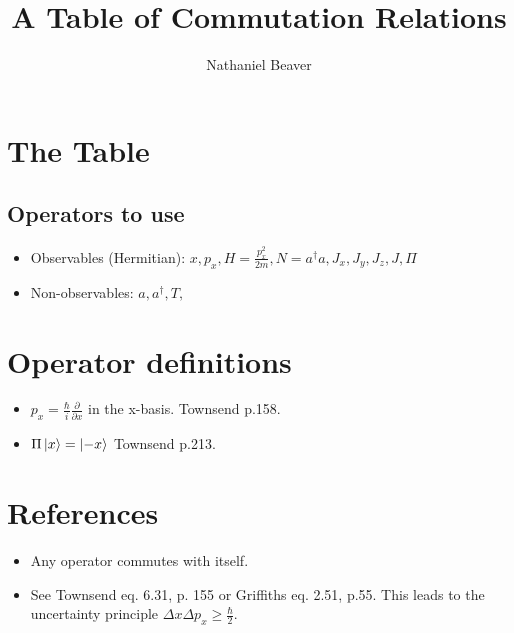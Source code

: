 \documentclass[12pt,letterpaper]{article}
\author{Nathaniel Beaver}
\title{A Table of Commutation Relations}
\begin{document}
\maketitle

\section{The Table}

\subsection{Operators to use}

\begin{itemize}
\item Observables (Hermitian): $x, p_x, H=\frac{p_x^2}{2m}, N=a^\dagger a, J_x, J_y, J_z, J, \hyperref[def_Pi]{\Pi}$
\item Non-observables: $a, a^\dagger, T, $
\end{itemize}



\renewcommand{\dtldisplayafterhead}{\hline} %
\renewcommand{\dtlstringalign}{r} %


\newpage

\section{Operator definitions}
\begin{itemize}
\item \label{def_p_x} $p_x = \frac{\hbar}{i}\frac{\partial}{\partial x}$ in the x-basis. Townsend p.158.
\item \label{def_Pi} $\Pi\ket{x}=\ket{-x}$ Townsend p.213.
\end{itemize}

\section{References}
\begin{itemize}
\item \label{self} Any operator commutes with itself.
\item \label{unc} See Townsend eq. 6.31, p. 155 or Griffiths eq. 2.51, p.55. This leads to the uncertainty principle $\Delta x \Delta p_x \geq \frac{\hbar}{2}$.
\end{itemize}
\end{document}
